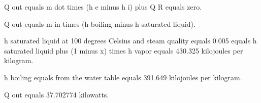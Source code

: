 Q out equals m dot times (h e minus h i) plus Q R equals zero.  

Q out equals m in times (h boiling minus h saturated liquid).  

h saturated liquid at 100 degrees Celsius and steam quality equals 0.005 equals h saturated liquid plus (1 minus x) times h vapor equals 430.325 kilojoules per kilogram.  

h boiling equals from the water table equals 391.649 kilojoules per kilogram.  

Q out equals 37.702774 kilowatts.